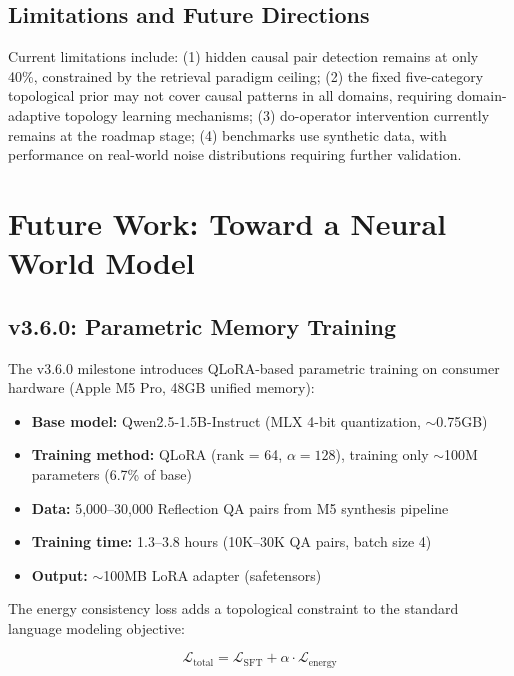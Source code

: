 \documentclass[11pt,a4paper]{article}
\begin{document}
\subsection{Limitations and Future Directions}

Current limitations include: (1) hidden causal pair detection remains at only 40\%, constrained by the retrieval paradigm ceiling; (2) the fixed five-category topological prior may not cover causal patterns in all domains, requiring domain-adaptive topology learning mechanisms; (3) do-operator intervention currently remains at the roadmap stage; (4) benchmarks use synthetic data, with performance on real-world noise distributions requiring further validation.

\section{Future Work: Toward a Neural World Model}
\label{sec:future}

\subsection{v3.6.0: Parametric Memory Training}

The v3.6.0 milestone introduces QLoRA-based parametric training on consumer hardware (Apple M5 Pro, 48GB unified memory):

\begin{itemize}[itemsep=0pt]
    \item \textbf{Base model:} Qwen2.5-1.5B-Instruct (MLX 4-bit quantization, \(\sim\)0.75GB)
    \item \textbf{Training method:} QLoRA (rank = 64, \(\alpha = 128\)), training only \(\sim\)100M parameters (6.7\% of base)
    \item \textbf{Data:} 5,000--30,000 Reflection QA pairs from M5 synthesis pipeline
    \item \textbf{Training time:} 1.3--3.8 hours (10K--30K QA pairs, batch size 4)
    \item \textbf{Output:} \(\sim\)100MB LoRA adapter (safetensors)
\end{itemize}

The energy consistency loss adds a topological constraint to the standard language modeling objective:

\begin{equation}
\mathcal{L}_{\text{total}} = \mathcal{L}_{\text{SFT}} + \alpha \cdot \mathcal{L}_{\text{energy}}
\label{eq:total_loss}
\end{equation}
\end{document}

